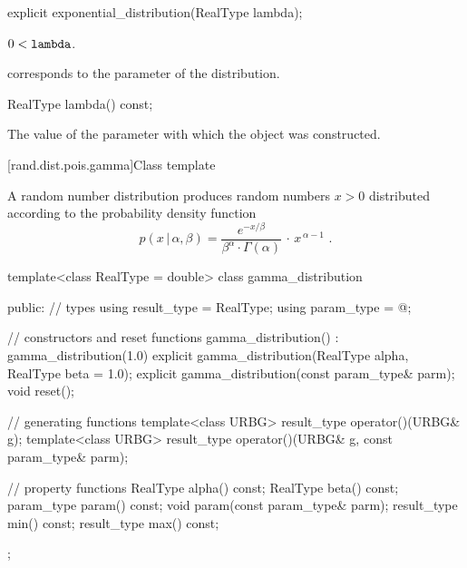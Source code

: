 %
\begin{itemdecl}
explicit exponential_distribution(RealType lambda);
\end{itemdecl}

\begin{itemdescr}
\pnum
\expects
$0 < \texttt{lambda}$.

\pnum
\remarks
{} corresponds to the parameter of the distribution.
\end{itemdescr}

%
\begin{itemdecl}
RealType lambda() const;
\end{itemdecl}

\begin{itemdescr}
\pnum
\returns
The value of the  parameter
 with which the object was constructed.
\end{itemdescr}


[rand.dist.pois.gamma]{Class template }%
%
%

\pnum
A  random number distribution
produces random numbers $x > 0$
distributed according to
the probability density function%
%
%
\[ p(x\,|\,\alpha,\beta) =
     \frac{e^{-x/\beta}}{\beta^{\alpha} \cdot \Gamma(\alpha)} \, \cdot \, x^{\, \alpha-1}
     \text{ .} \]

%
%
\begin{codeblock}
template<class RealType = double>
  class gamma_distribution {
  public:
    // types
    using result_type = RealType;
    using param_type  = @\unspec@;

    // constructors and reset functions
    gamma_distribution() : gamma_distribution(1.0) {}
    explicit gamma_distribution(RealType alpha, RealType beta = 1.0);
    explicit gamma_distribution(const param_type& parm);
    void reset();

    // generating functions
    template<class URBG>
      result_type operator()(URBG& g);
    template<class URBG>
      result_type operator()(URBG& g, const param_type& parm);

    // property functions
    RealType alpha() const;
    RealType beta() const;
    param_type param() const;
    void param(const param_type& parm);
    result_type min() const;
    result_type max() const;
  };
\end{codeblock}


